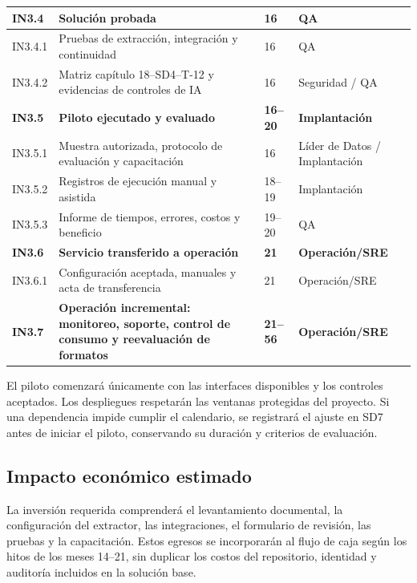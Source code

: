 \begin{longtable}{
L{\tabcolsep\relax}
L{\tabcolsep\relax}
L{\tabcolsep\relax}
L{\tabcolsep\relax}
}
\textbf{IN3.4} & \textbf{Solución probada} &
\textbf{16} & \textbf{QA} \\
\hline
IN3.4.1 & Pruebas de extracción, integración y continuidad &
16 & QA \\
\hline
IN3.4.2 & Matriz capítulo 18--SD4--T-12 y evidencias
de controles de IA &
16 & Seguridad / QA \\
\hline

\textbf{IN3.5} & \textbf{Piloto ejecutado y evaluado} &
\textbf{16--20} & \textbf{Implantación} \\
\hline
IN3.5.1 & Muestra autorizada, protocolo de evaluación
y capacitación &
16 & Líder de Datos / Implantación \\
\hline
IN3.5.2 & Registros de ejecución manual y asistida &
18--19 & Implantación \\
\hline
IN3.5.3 & Informe de tiempos, errores, costos y beneficio &
19--20 & QA \\
\hline

\textbf{IN3.6} & \textbf{Servicio transferido a operación} &
\textbf{21} & \textbf{Operación/SRE} \\
\hline
IN3.6.1 & Configuración aceptada, manuales y acta
de transferencia &
21 & Operación/SRE \\
\hline

\textbf{IN3.7} &
\textbf{Operación incremental: monitoreo, soporte,
control de consumo y reevaluación de formatos} &
\textbf{21--56} & \textbf{Operación/SRE} \\
\hline
\end{longtable}

El piloto comenzará únicamente con las interfaces disponibles
y los controles aceptados. Los despliegues respetarán las ventanas
protegidas del proyecto. Si una dependencia impide cumplir
el calendario, se registrará el ajuste en SD7 antes de iniciar
el piloto, conservando su duración y criterios de evaluación.


\subsection{Impacto económico estimado}

La inversión requerida comprenderá el levantamiento documental,
la configuración del extractor, las integraciones, el formulario
de revisión, las pruebas y la capacitación. Estos egresos se
incorporarán al flujo de caja según los hitos de los meses 14--21,
sin duplicar los costos del repositorio, identidad y auditoría
incluidos en la solución base.


